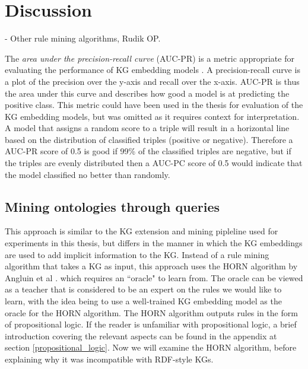 \chapter{Discussion}

- Other rule mining algorithms, Rudik OP.

The \textit{area under the precision-recall curve} (AUC-PR) is a metric appropriate for evaluating the performance of KG embedding models \cite{jahn2021reasoning}. A precision-recall curve is a plot of the precision over the y-axis and recall over the x-axis. AUC-PR is thus the area under this curve and describes how good a model is at predicting the positive class. This metric could have been used in the thesis for evaluation of the KG embedding models, but was omitted as it requires context for interpretation. A model that assigns a random score to a triple will result in a horizontal line based on the distribution of classified triples (positive or negative). Therefore a AUC-PR score of 0.5 is good if 99\% of the classified triples are negative, but if the triples are evenly distributed then a AUC-PC score of 0.5 would indicate that the model classified no better than randomly.


\section{Mining ontologies through queries}
This approach is similar to the KG extension and mining pipleline used for experiments in this thesis, but differs in the manner in which the KG embeddings are used to add implicit information to the KG. Instead of a rule mining algorithm that takes a KG as input, this approach uses the HORN algorithm by Angluin et al \cite{DBLP:journals/ml/AngluinFP92}. which requires an ``oracle" to learn from. The oracle can be viewed as a teacher that is considered to be an expert on the rules we would like to learn, with the idea being to use a well-trained KG embedding model as the oracle for the HORN algorithm. The HORN algorithm outputs rules in the form of propositional logic. If the reader is unfamiliar with propositional logic, a brief introduction covering the relevant aspects can be found in the appendix at section \ref{propositional_logic}. Now we will examine the HORN algorithm, before explaining why it was incompatible with RDF-style KGs.

